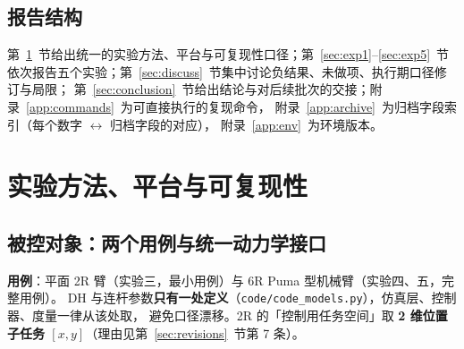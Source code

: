 \documentclass[11pt,a4paper]{ctexart}
\begin{document}
\begin{table}[H]
\centering
\small
{}
\end{table}

\subsection{报告结构}

第~\ref{sec:method}~节给出统一的实验方法、平台与可复现性口径；第~\ref{sec:exp1}--\ref{sec:exp5}~节
依次报告五个实验；第~\ref{sec:discuss}~节集中讨论负结果、未做项、执行期口径修订与局限；
第~\ref{sec:conclusion}~节给出结论与对后续批次的交接；附录~\ref{app:commands}~为可直接执行的复现命令，
附录~\ref{app:archive}~为归档字段索引（每个数字 $\leftrightarrow$ 归档字段的对应），
附录~\ref{app:env}~为环境版本。

\section{实验方法、平台与可复现性}\label{sec:method}

\subsection{被控对象：两个用例与统一动力学接口}

\textbf{用例}：平面 2R 臂（实验三，最小用例）与 6R Puma 型机械臂（实验四、五，完整用例）。
DH 与连杆参数\textbf{只有一处定义}（\texttt{code/code\_models.py}），仿真层、控制器、度量一律从该处取，
避免口径漂移。2R 的「控制用任务空间」取 \textbf{2 维位置子任务 $[x,y]$}（理由见第~\ref{sec:revisions}~节第 7 条）。
\end{document}
